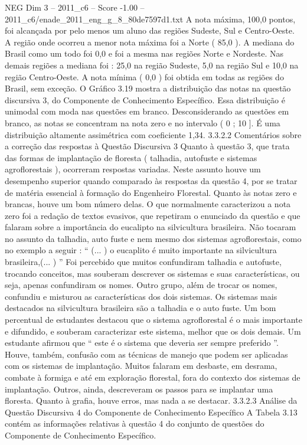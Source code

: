 \begin{textsample}{NEG Dim 3 – 2011\_c6 – Score -1.00 – 2011\_c6/enade\_2011\_eng\_g\_8\_80de7597d1.txt}
A nota máxima, 100,0 pontos, foi alcançada por pelo menos um aluno das regiões Sudeste, Sul e Centro-Oeste.
A região onde ocorreu a menor nota máxima foi a Norte ( 85,0 ).
A mediana do Brasil como um todo foi 0,0 e foi a mesma nas regiões Norte e Nordeste.
Nas demais regiões a mediana foi : 25,0 na região Sudeste, 5,0 na região Sul e 10,0 na região Centro-Oeste.
A nota mínima ( 0,0 ) foi obtida em todas as regiões do Brasil, sem exceção.
O Gráfico 3.19 mostra a distribuição das notas na questão discursiva 3, do Componente de Conhecimento Específico.
Essa distribuição é unimodal com moda nas questões em branco.
Desconsiderando as questões em branco, as notas se concentram na nota zero e no intervalo ( 0 ; 10 ].
É uma distribuição altamente assimétrica com coeficiente 1,34. 3.3.2.2 Comentários sobre a correção das respostas à Questão Discursiva 3 Quanto à questão 3, que trata das formas de implantação de floresta ( talhadia, autofuste e sistemas agroflorestais ), ocorreram respostas variadas.
Neste assunto houve um desempenho superior quando comparado às respostas da questão 4, por se tratar de matéria essencial à formação do Engenheiro Florestal.
Quanto às notas zero e brancas, houve um bom número delas.
O que normalmente caracterizou a nota zero foi a redação de textos evasivos, que repetiram o enunciado da questão e que falaram sobre a importância do eucalipto na silvicultura brasileira.
Não tocaram no assunto da talhadia, auto fuste e nem mesmo dos sistemas agroflorestais, como no exemplo a seguir : “ (... ) o eucaplito é muito importante na silvicultura brasileira,(... ) ” Foi percebido que muitos confundiram talhadia e autofuste, trocando conceitos, mas souberam descrever os sistemas e suas características, ou seja, apenas confundiram os nomes.
Outro grupo, além de trocar os nomes, confundiu e misturou as características dos dois sistemas.
Os sistemas mais destacados na silvicultura brasileira são a talhadia e o auto fuste.
Um bom percentual de estudantes destacou que o sistema agroflorestal é o mais importante e difundido, e souberam caracterizar este sistema, melhor que os dois demais.
Um estudante afirmou que “ este é o sistema que deveria ser sempre preferido ”.
Houve, também, confusão com as técnicas de manejo que podem ser aplicadas com os sistemas de implantação.
Muitos falaram em desbaste, em desrama, combate à formiga e até em exploração florestal, fora do contexto dos sistemas de implantação.
Outros, ainda, descreveram os passos para se implantar uma floresta.
Quanto à grafia, houve erros, mas nada a se destacar. 3.3.2.3 Análise da Questão Discursiva 4 do Componente de Conhecimento Específico A Tabela 3.13 contém as informações relativas à questão 4 do conjunto de questões do Componente de Conhecimento Específico.

\end{textsample}
